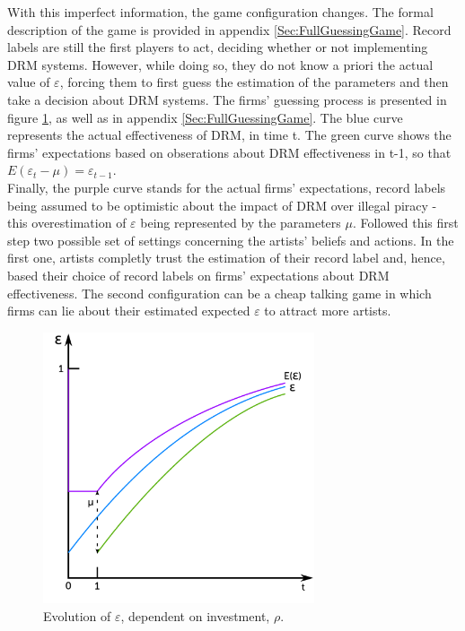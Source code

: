 \documentclass[letter,12pt]{article}
\numberwithin{equation}{section}
\begin{document}
With this imperfect information, the game configuration changes. The
formal description of the game is provided in appendix \ref{Sec:FullGuessingGame}. Record labels
are still the first players to act, deciding whether or not implementing
DRM systems. However, while doing so, they do not know a priori the
actual value of $\varepsilon$, forcing them to first guess the estimation
of the parameters and then take a decision about DRM systems. The
firms' guessing process is presented in figure \ref{Fig:EpsilonGuessing}, as well as in appendix \ref{Sec:FullGuessingGame}.
The blue curve represents the actual effectiveness of DRM, in time
t. The green curve shows the firms' expectations based on obserations
about DRM effectiveness in t-1, so that $E(\varepsilon_{t}-\mu)=\varepsilon_{t-1}$.\\

Finally, the purple curve stands for the actual firms' expectations,
record labels being assumed to be optimistic about the impact of DRM
over illegal piracy - this overestimation of $\varepsilon$ being
represented by the parameters $\mu$. Followed this first step two
possible set of settings concerning the artists' beliefs and actions.
In the first one, artists completly trust the estimation of their
record label and, hence, based their choice of record labels on firms'
expectations about DRM effectiveness. The second configuration can
be a cheap talking game in which firms can lie about their estimated
expected $\varepsilon$ to attract more artists.\\

\begin{figure}[h!]
\centering
\includegraphics[width=8cm]{Graphics/graph2.pdf}
\caption{Evolution of $\varepsilon$, dependent on investment, $\rho$.}
\label{Fig:EpsilonGuessing}
\end{figure}
\end{document}
